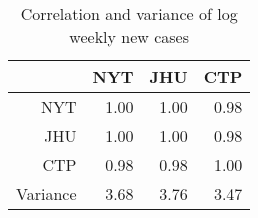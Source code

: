 \begin{table}[ht]
\centering
\begin{tabular}{rrrr}
  \hline
 & NYT & JHU & CTP \\ 
  \hline
NYT & 1.00 & 1.00 & 0.98 \\ 
  JHU & 1.00 & 1.00 & 0.98 \\ 
  CTP & 0.98 & 0.98 & 1.00 \\ 
  Variance & 3.68 & 3.76 & 3.47 \\ 
   \hline
\end{tabular}
\caption{Correlation and variance of log weekly new cases\label{tab:weekcasecor}} 
\end{table}
